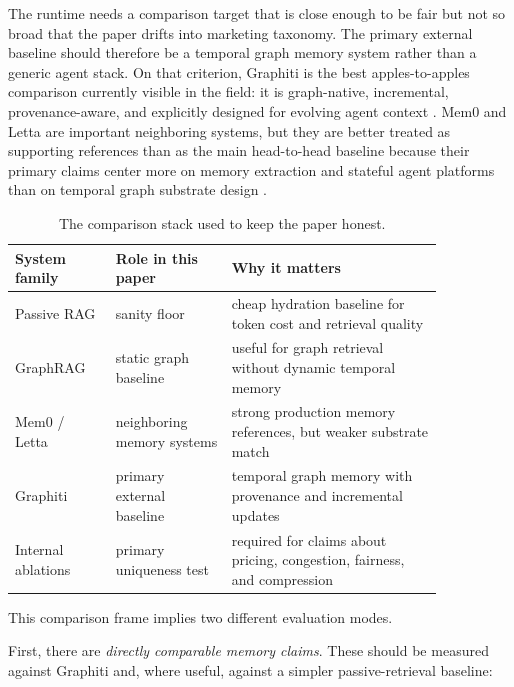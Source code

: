 The runtime needs a comparison target that is close enough to be fair but not so broad that the paper drifts into marketing taxonomy. The primary external baseline should therefore be a temporal graph memory system rather than a generic agent stack. On that criterion, Graphiti is the best apples-to-apples comparison currently visible in the field: it is graph-native, incremental, provenance-aware, and explicitly designed for evolving agent context \citep{rasmussen2025zep}. Mem0 and Letta are important neighboring systems, but they are better treated as supporting references than as the main head-to-head baseline because their primary claims center more on memory extraction and stateful agent platforms than on temporal graph substrate design \citep{mem02025,packer2023memgpt}.

\begin{table}[t]
\centering
\small
\begin{tabular}{p{0.2\linewidth}p{0.23\linewidth}p{0.42\linewidth}}
\toprule
System family & Role in this paper & Why it matters \\
\midrule
Passive RAG & sanity floor & cheap hydration baseline for token cost and retrieval quality \\
GraphRAG & static graph baseline & useful for graph retrieval without dynamic temporal memory \\
Mem0 / Letta & neighboring memory systems & strong production memory references, but weaker substrate match \\
Graphiti & primary external baseline & temporal graph memory with provenance and incremental updates \\
Internal ablations & primary uniqueness test & required for claims about pricing, congestion, fairness, and compression \\
\bottomrule
\end{tabular}
\caption{The comparison stack used to keep the paper honest.}
\end{table}

This comparison frame implies two different evaluation modes.

First, there are \emph{directly comparable memory claims}. These should be measured against Graphiti and, where useful, against a simpler passive-retrieval baseline:

